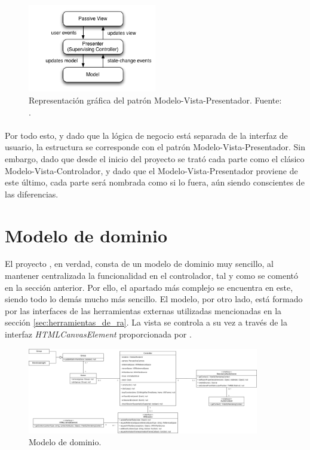 \documentclass{subfiles}
\begin{document}
        \begin{figure}
        \centering
        \includegraphics[width=0.5\textwidth]{img/mvp.png}
        \caption[Representación gráfica del patrón Modelo-Vista-Presentador.]{Representación gráfica del patrón Modelo-Vista-Presentador. Fuente: .}
        \label{fig:mvp}
        \end{figure}

        \paragraph{}
        Por todo esto, y dado que la lógica de negocio está separada de la interfaz de usuario, la estructura se corresponde con el patrón Modelo-Vista-Presentador. Sin embargo, dado que desde el inicio del proyecto se trató cada parte como el clásico Modelo-Vista-Controlador, y dado que el Modelo-Vista-Presentador proviene de este último, cada parte será nombrada como si lo fuera, aún siendo conscientes de las diferencias.

        \section{Modelo de dominio}
        \label{sec:modelo_de_dominio}
        El proyecto \titlename, en verdad, consta de un modelo de dominio muy sencillo, al mantener centralizada la funcionalidad en el controlador, tal y como se comentó en la sección anterior. Por ello, el apartado más complejo se encuentra en este, siendo todo lo demás mucho más sencillo. El modelo, por otro lado, está formado por las interfaces de las herramientas externas utilizadas mencionadas en la sección \ref{sec:herramientas_de_ra}. La vista se controla a su vez a través de la interfaz \textit{HTMLCanvasElement} proporcionada por \js.

\begin{figure}[ht]
\centering
\includegraphics[width=0.9\textwidth]{img/analisis_modelo_de_dominio.png}
\caption{Modelo de dominio.}
\label{fig:analisis_modelo_de_dominio}
\end{figure}
\end{document}
